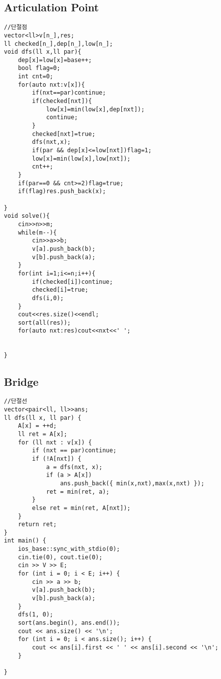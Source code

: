 \documentclass[landscape, 8pt, a4paper, oneside, twocolumn]{extarticle}
\begin{document}
\subsection {Articulation Point}
\begin{verbatim}
//단절점
vector<ll>v[n_],res;
ll checked[n_],dep[n_],low[n_];
void dfs(ll x,ll par){
    dep[x]=low[x]=base++;
    bool flag=0;
    int cnt=0;
    for(auto nxt:v[x]){
        if(nxt==par)continue;
        if(checked[nxt]){
            low[x]=min(low[x],dep[nxt]);
            continue;
        }
        checked[nxt]=true;
        dfs(nxt,x);
        if(par && dep[x]<=low[nxt])flag=1;
        low[x]=min(low[x],low[nxt]);
        cnt++;
    }
    if(par==0 && cnt>=2)flag=true;
    if(flag)res.push_back(x);
    
}
void solve(){
    cin>>n>>m;
    while(m--){
        cin>>a>>b;
        v[a].push_back(b);
        v[b].push_back(a);
    }
    for(int i=1;i<=n;i++){
        if(checked[i])continue; 
        checked[i]=true;
        dfs(i,0);
    }
    cout<<res.size()<<endl;
    sort(all(res));
    for(auto nxt:res)cout<<nxt<<' ';
    
    
}

\end{verbatim}
\newpage

\subsection {Bridge}
\begin{verbatim}
//단절선
vector<pair<ll, ll>>ans;
ll dfs(ll x, ll par) {
	A[x] = ++d;
	ll ret = A[x];
	for (ll nxt : v[x]) {
		if (nxt == par)continue;
		if (!A[nxt]) {
			a = dfs(nxt, x);
			if (a > A[x])
				ans.push_back({ min(x,nxt),max(x,nxt) });
			ret = min(ret, a);
		}
		else ret = min(ret, A[nxt]);
	}
	return ret;
}
int main() {
	ios_base::sync_with_stdio(0);
	cin.tie(0), cout.tie(0);
	cin >> V >> E;
	for (int i = 0; i < E; i++) {
		cin >> a >> b;
		v[a].push_back(b);
		v[b].push_back(a);
	}
	dfs(1, 0);
	sort(ans.begin(), ans.end());
	cout << ans.size() << '\n';
	for (int i = 0; i < ans.size(); i++) {
		cout << ans[i].first << ' ' << ans[i].second << '\n';
	}

}

\end{verbatim}
\newpage
\end{document}
